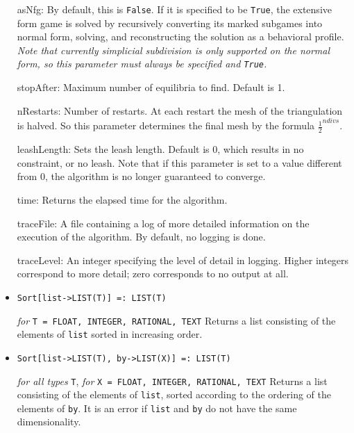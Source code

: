 \begin{itemize}
\bd
\item
[asNfg:] By default, this is \verb+False+.  If it is specified to be
\verb+True+, the extensive form game is solved by recursively converting
its marked subgames into normal form, solving, and reconstructing the
solution as a behavioral profile.  {\it Note that currently simplicial
subdivision is only supported on the normal form, so this parameter
must always be specified and {\tt True}.}
\item
[stopAfter:] Maximum number of equilibria to find. Default is 1.  
\item 
[nRestarts:] Number of restarts.  At each restart the mesh of the
triangulation is halved.  So this parameter determines the final mesh
by the formula $\frac{1}{2}^{ndivs}$.
\item
[leashLength:] Sets the leash length. Default is 0, which results in no
constraint, or no leash.  Note that if this parameter is set to a value
different from 0, the algorithm is no longer guaranteed to converge.
\item
[time:] Returns the elapsed time for the algorithm.
\item
[traceFile:] A file containing a log of more detailed information on the
execution of the algorithm.  By default, no logging is done.
\item
[traceLevel:] An integer specifying the level of detail in logging.
Higher integers correspond to more detail; zero corresponds to
no output at all.
\ed
\ed

\item
\protect \large \begin{verbatim}
Sort[list->LIST(T)] =: LIST(T)
\end{verbatim} \normalsize

{\it for} {\tt T = FLOAT, INTEGER, RATIONAL, TEXT}
\bd
Returns a list consisting of the elements of \verb+list+ sorted in
increasing order.
\ed

\item
\protect \large \begin{verbatim}
Sort[list->LIST(T), by->LIST(X)] =: LIST(T)
\end{verbatim} \normalsize

{\it for all types} {\tt T}, {\it for} {\tt X = FLOAT, INTEGER, RATIONAL,
TEXT}
\bd
Returns a list consisting of the elements of \verb+list+, sorted
according to the ordering of the elements of \verb+by+.  It is an
error if \verb+list+ and \verb+by+ do not have the same dimensionality.
\ed


\end{itemize}
